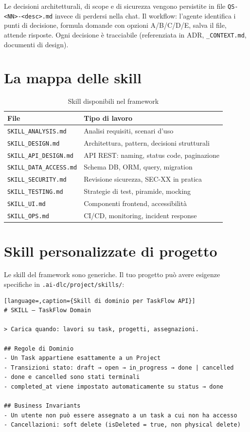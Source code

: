 Le decisioni architetturali, di scope e di sicurezza vengono persistite in file \texttt{QS-<NN>-<desc>.md} invece di perdersi nella chat. Il workflow: l'agente identifica i punti di decisione, formula domande con opzioni A/B/C/D/E, salva il file, attende risposte. Ogni decisione è tracciabile (referenziata in ADR, \texttt{\_CONTEXT.md}, documenti di design).

\section{La mappa delle skill}
\label{sec:12-mappa-skill}

\begin{table}[htbp]
  \centering
  \begin{tabular}{ll}
    \toprule
    \textbf{File} & \textbf{Tipo di lavoro} \\
    \midrule
    \texttt{SKILL\_ANALYSIS.md} & Analisi requisiti, scenari d'uso \\
    \texttt{SKILL\_DESIGN.md} & Architettura, pattern, decisioni strutturali \\
    \texttt{SKILL\_API\_DESIGN.md} & API REST: naming, status code, paginazione \\
    \texttt{SKILL\_DATA\_ACCESS.md} & Schema DB, ORM, query, migration \\
    \texttt{SKILL\_SECURITY.md} & Revisione sicurezza, SEC-XX in pratica \\
    \texttt{SKILL\_TESTING.md} & Strategie di test, piramide, mocking \\
    \texttt{SKILL\_UI.md} & Componenti frontend, accessibilità \\
    \texttt{SKILL\_OPS.md} & CI/CD, monitoring, incident response \\
    \bottomrule
  \end{tabular}
  \caption{Skill disponibili nel framework}
  \label{tab:12-skill}
\end{table}

\section{Skill personalizzate di progetto}
\label{sec:12-skill-progetto}

Le skill del framework sono generiche. Il tuo progetto può avere esigenze specifiche in \texttt{.ai-dlc/project/skills/}:

\begin{lstlisting}[language=,caption={Skill di dominio per TaskFlow API}]
# SKILL — TaskFlow Domain

> Carica quando: lavori su task, progetti, assegnazioni.

## Regole di Dominio
- Un Task appartiene esattamente a un Project
- Transizioni stato: draft → open → in_progress → done | cancelled
- done e cancelled sono stati terminali
- completed_at viene impostato automaticamente su status → done

## Business Invariants
- Un utente non può essere assegnato a un task a cui non ha accesso
- Cancellazioni: soft delete (isDeleted = true, non physical delete)
\end{lstlisting}

